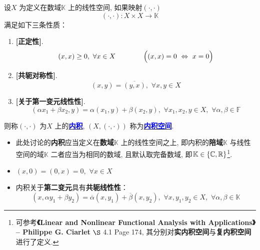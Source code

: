	\begin{defn}\label{def 3.1.1}
		设$X$ 为定义在数域$\mathbb{K}$ 上的线性空间, 如果映射$(\cdot , \cdot)$
		\[ (\cdot , \cdot) : X \times X \longrightarrow \mathbb{K} \]
		满足如下三条性质：
		\begin{enumerate}
			\item \textbf{[正定性]}. 
			\[ (x , x) \geq 0 , \,\, \forall x \in X \hspace*{4em} \Big( (x , x) = 0 \,\, \Leftrightarrow \,\, x = 0 \Big) \]
			
			\item \textbf{[共轭对称性]}. 
			\[ (x , y) = \overline{(y , x)} , \,\, \forall x , y \in X \]
			
			\item \textbf{[关于第一变元线性性]}. 
			\[ (\alpha x_1 + \beta x_2 , y) = \alpha (x_1 , y) + \beta (x_2 , y) , \,\, \forall x_1 , x_2 , y \in X , \,\, \forall \alpha , \beta \in \mathbb{F} \]
		\end{enumerate}
		则称$(\cdot , \cdot)$ 为$X$ 上的\underline{\textcolor{blue}{\textbf{内积}}}, $(X , (\cdot , \cdot))$ 称为\underline{\textcolor{blue}{\textbf{内积空间}}}. 
		
		\vspace{3em}
		
		\begin{rmk}
			\begin{itemize}
				\item 此处讨论的\textbf{内积}应当定义在\textbf{数域$\mathbb{K}$} 上的线性空间之上, 即内积的\textbf{陪域$\mathbb{K}$} 与线性空间的域$\mathbb{K}$ 二者应当为相同的数域, 且默认取完备数域, 即$\mathbb{K} \in \{ \mathbb{C} , \mathbb{R} \}$\footnote{可参考\textbf{《Linear and Nonlinear Functional Analysis with Applications》 -- Philippe G. Ciarlet} $\S$ 4.1 Page 174, 其分别对\textbf{实内积空间}与\textbf{复内积空间}进行了定义.}. 
				
				\vspace{1em}
				
				\item $(x , 0) = (0 , x) = 0 , \,\, \forall x \in X$
				
				\newpage
				
				\item 内积关于\textbf{第二变元}具有\textbf{共轭线性性}：
				\[ (x , \alpha y_1 + \beta y_2) = \overline{\alpha} (x , y_1) + \overline{\beta} (x , y_2) , \,\, \forall x , y_1 , y_2 \in X , \,\, \forall \alpha , \beta \in \mathbb{K} \]
				
				\vspace{1em}
				

\end{itemize}
\end{rmk}
\end{defn}

